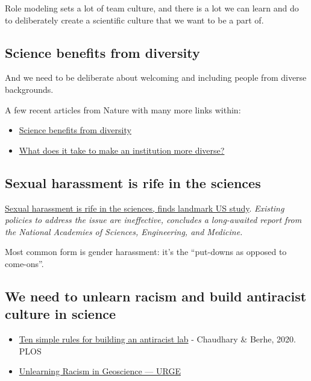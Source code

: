 \documentclass[
  letterpaper,
  DIV=11,
  numbers=noendperiod]{scrreprt}
\providecommand{\tightlist}{%
  \setlength{\itemsep}{0pt}\setlength{\parskip}{0pt}}
\begin{document}
Role modeling sets a lot of team culture, and there is a lot we can
learn and do to deliberately create a scientific culture that we want to
be a part of.

\hypertarget{science-benefits-from-diversity}{%
\subsection{Science benefits from
diversity}\label{science-benefits-from-diversity}}

And we need to be deliberate about welcoming and including people from
diverse backgrounds.

A few recent articles from Nature with many more links within:

\begin{itemize}
\tightlist
\item
  \href{https://www.nature.com/articles/d41586-018-05326-3}{Science
  benefits from diversity}
\item
  \href{https://www.nature.com/articles/d41586-018-05317-4}{What does it
  take to make an institution more diverse?}
\end{itemize}

\hypertarget{sexual-harassment-is-rife-in-the-sciences}{%
\subsection{Sexual harassment is rife in the
sciences}\label{sexual-harassment-is-rife-in-the-sciences}}

\href{https://www.nature.com/articles/d41586-018-05404-6}{Sexual
harassment is rife in the sciences, finds landmark US study}.
\emph{Existing policies to address the issue are ineffective, concludes
a long-awaited report from the National Academies of Sciences,
Engineering, and Medicine.}

Most common form is gender harassment: it's the ``put-downs as opposed
to come-ons''.

\hypertarget{we-need-to-unlearn-racism-and-build-antiracist-culture-in-science}{%
\subsection{We need to unlearn racism and build antiracist culture in
science}\label{we-need-to-unlearn-racism-and-build-antiracist-culture-in-science}}

\begin{itemize}
\tightlist
\item
  \href{https://journals.plos.org/ploscompbiol/article?id=10.1371/journal.pcbi.1008210}{Ten
  simple rules for building an antiracist lab} - Chaudhary \& Berhe,
  2020. PLOS
\item
  \href{https://urgeoscience.org/}{Unlearning Racism in Geoscience ---
  URGE}
\end{itemize}
\end{document}
